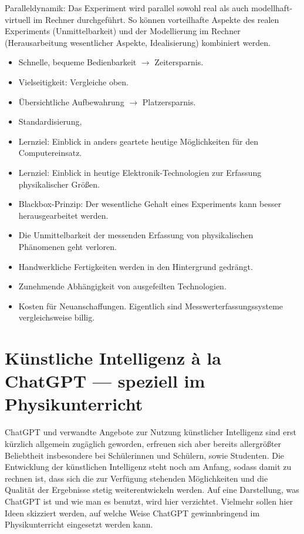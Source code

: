 \mip
Paralleldynamik: Das Experiment wird parallel sowohl real als auch modellhaft-virtuell im Rechner durchgef\"{u}hrt.
So k\"{o}nnen vorteilhafte Aspekte des realen Experiments (Unmittelbarkeit) und der Modellierung im Rechner (Herausarbeitung
wesentlicher Aspekte, Idealisierung) kombiniert werden.

\begin{itemize}
\item Schnelle, bequeme Bedienbarkeit $\to$ Zeitersparnis.
\item Vielseitigkeit: Vergleiche oben.
\item \"{U}bersichtliche Aufbewahrung $\to$ Platzersparnis.
\item Standardisierung,
\item Lernziel: Einblick in anders geartete heutige M\"{o}glichkeiten f\"{u}r den Computereinsatz.
\item Lernziel: Einblick in heutige Elektronik-Technologien zur Erfassung physikalischer Gr\"{o}{\ss}en.
\item Blackbox-Prinzip: Der wesentliche Gehalt eines Experiments kann besser herausgearbeitet werden.
\end{itemize}


\begin{itemize}
\item Die Unmittelbarkeit der messenden Erfassung von physikalischen Ph\"{a}nomenen geht verloren.
\item Handwerkliche Fertigkeiten werden in den Hintergrund gedr\"{a}ngt.
\item Zunehmende Abh\"{a}ngigkeit von ausgefeilten Technologien.
\item Kosten f\"{u}r Neuanschaffungen. Eigentlich sind Messwerterfassungssysteme vergleichsweise billig.
\end{itemize}


\bip\bip
\section{K\"{u}nstliche Intelligenz \`{a} la ChatGPT --- speziell im Physikunterricht}

ChatGPT und verwandte Angebote zur Nutzung k\"{u}nstlicher Intelligenz sind erst k\"{u}rzlich allgemein zug\"{a}glich geworden, erfreuen sich aber bereits allergr\"{o}{\ss}ter Beliebtheit insbesondere bei Sch\"{u}lerinnen und Sch\"{u}lern, sowie Studenten. Die Entwicklung der k\"{u}nstlichen Intelligenz steht noch am Anfang, sodass damit zu rechnen ist, dass sich die zur Verf\"{u}gung stehenden M\"{o}glichkeiten und die Qualit\"{a}t der Ergebnisse stetig weiterentwickeln werden. Auf eine Darstellung, was ChatGPT ist und wie man es benutzt, wird hier verzichtet. Vielmehr sollen hier Ideen skizziert werden, auf welche Weise ChatGPT gewinnbringend im Physikunterricht eingesetzt werden kann.

